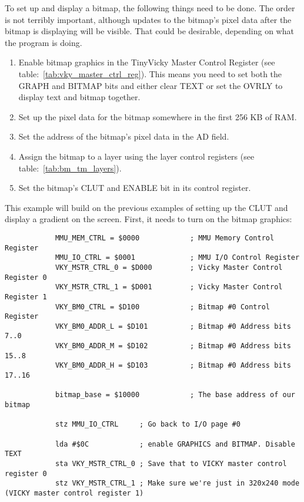 To set up and display a bitmap, the following things need to be done. The order is not terribly important, although updates to the bitmap's pixel data after the bitmap is displaying will be visible. That could be desirable, depending on what the program is doing.

\begin{enumerate}
    \item Enable bitmap graphics in the TinyVicky Master Control Register (see table:~\ref{tab:vky_master_ctrl_reg}). This means you need to set both the GRAPH and BITMAP bits and either clear TEXT or set the OVRLY to display text and bitmap together.

    \item Set up the pixel data for the bitmap somewhere in the first 256 KB of RAM.

    \item Set the address of the bitmap's pixel data in the AD field.

    \item Assign the bitmap to a layer using the layer control registers (see table:~\ref{tab:bm_tm_layers}).

    \item Set the bitmap's CLUT and ENABLE bit in its control register.
\end{enumerate}

\label{ex:bitmap}

This example will build on the previous examples of setting up the CLUT and display a gradient on the screen. First, it needs to turn on the bitmap graphics:

\begin{verbatim}
            MMU_MEM_CTRL = $0000            ; MMU Memory Control Register
            MMU_IO_CTRL = $0001             ; MMU I/O Control Register
            VKY_MSTR_CTRL_0 = $D000         ; Vicky Master Control Register 0
            VKY_MSTR_CTRL_1 = $D001         ; Vicky Master Control Register 1
            VKY_BM0_CTRL = $D100            ; Bitmap #0 Control Register
            VKY_BM0_ADDR_L = $D101          ; Bitmap #0 Address bits 7..0
            VKY_BM0_ADDR_M = $D102          ; Bitmap #0 Address bits 15..8
            VKY_BM0_ADDR_H = $D103          ; Bitmap #0 Address bits 17..16

            bitmap_base = $10000            ; The base address of our bitmap

            stz MMU_IO_CTRL     ; Go back to I/O page #0

            lda #$0C            ; enable GRAPHICS and BITMAP. Disable TEXT
            sta VKY_MSTR_CTRL_0 ; Save that to VICKY master control register 0
            stz VKY_MSTR_CTRL_1 ; Make sure we're just in 320x240 mode (VICKY master control register 1)
\end{verbatim}

